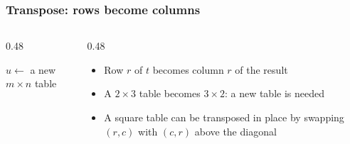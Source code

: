 \documentclass[aspectratio=169,10pt,compress]{beamer}
\begin{document}
\begin{frame}[t,fragile] \frametitle{Transpose: rows become columns}
	\begin{center}
	\end{center}

	\begin{columns}[T]
		\begin{column}{0.48\textwidth}


\begin{algorithm}[H]
				\caption{Transpose($t$), $n \times m$}
				$u \gets$ a new $m \times n$ table\;
				\;
\end{algorithm}

		\end{column}
		\begin{column}{0.48\textwidth}
			\begin{itemize}\small
				\item Row $r$ of $t$ becomes column $r$ of the result
				\item A $2 \times 3$ table becomes $3 \times 2$: a new table is needed
				\item A square table can be transposed in place by swapping $(r, c)$ with $(c, r)$ above the diagonal
			\end{itemize}
		\end{column}
	\end{columns}
\end{frame}




\end{document}
